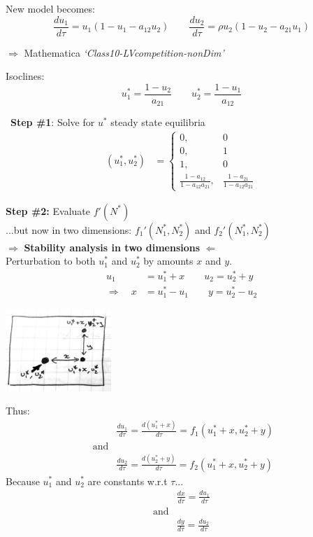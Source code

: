 \documentclass{article}
\newcommand{\note}[1]{\colorbox{gray!30}{#1}}
\newcommand{\ind}{\-\hspace{1cm}}
\begin{document}
New model becomes:
\begin{equation*}
	\frac{d u_1}{d\tau}=u_1(1-u_1 - a_{12}u_2) \quad \quad \frac{d u_2}{d\tau}=\rho u_2(1-u_2 - a_{21}u_1)
\end{equation*}

\note{$\Rightarrow$ Mathematica \emph{`Class10-LVcompetition-nonDim'}}
\vspace{0.5cm}

Isoclines:
\begin{equation*}
	u_1^*=\frac{1-u_2}{a_{21}} \quad \quad u_2^*=\frac{1-u_1}{a_{12}}
\end{equation*}

\
\textbf{Step \#1}: Solve for $u^*$ steady state equilibria
\begin{align*}
(u_1^*,u_2^*)& =
\begin{cases}
	 0 , & 0  \\
	0, & 1  \\
	1, & 0\\
	\frac{1-a_{12}}{1- a_{12} a_{21} }, & \frac{1-a_{21}}{1- a_{12} a_{21} }
\end{cases}
\end{align*}


\textbf{Step \#2:} Evaluate $f'(N^*)$ \\
\ind \ind \ind \ind ...but now in two dimensions:  $f_1'(N_1^*,N_2^*)$ and $f_2'(N_1^*,N_2^*)$\\

$\Rightarrow$ \textbf{Stability analysis in two dimensions} $\Leftarrow$\\
Perturbation to both $u_1^*$ and $u_2^*$ by amounts $x$ and $y$.
\begin{align*}
	u_1 & = u_1^* + x \quad \quad u_2  = u_2^* + y\\
	\Rightarrow \quad x & =u_1^* - u_1 \quad \quad y  = u_2^* - u_2
\end{align*}

\begin{center}
	\includegraphics[width=4cm]{figs/2Dperturb.pdf}
\end{center}

Thus:
\begin{align*}
	&\frac{du_1}{d\tau}=\frac{d (u_1^* + x)}{d\tau}=f_1(u_1^*+x,u_2^*+y)\\
	\text{ and} &\\
	&\frac{du_2}{d\tau}=\frac{d (u_2^* + y)}{d\tau}=f_2(u_1^*+x,u_2^*+y)	
\end{align*}
Because $u_1^*$ and $u_2^*$ are constants w.r.t $\tau$...
\begin{align*}
	&\frac{dx}{d\tau} = \frac{du_1}{d\tau}\\
	\text{and}&\\
	&\frac{dy}{d\tau}= \frac{du_2}{d\tau}
\end{align*}
\end{document}
